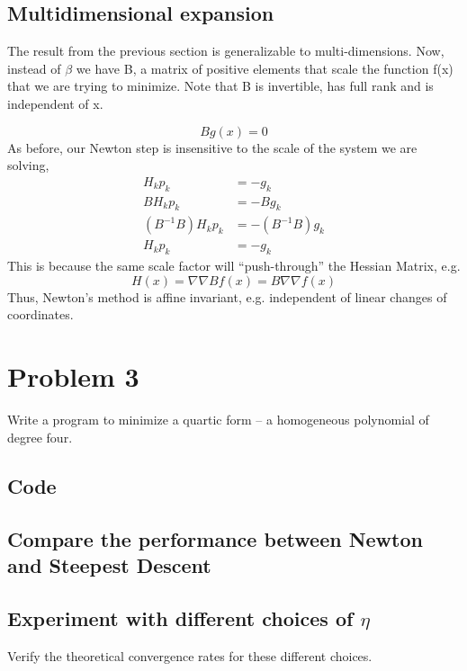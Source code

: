 \documentclass{article}
\begin{document}
\subsection{Multidimensional expansion}

The result from the previous section is generalizable to
multi-dimensions. Now, instead of $\beta$ we have B, a matrix of
positive elements that scale the function f(x) that we are trying to
minimize. Note that B is invertible, has full rank and is independent of
x. 

\begin{equation}
 Bg(x) = 0
\end{equation}
As before, our Newton step is insensitive to the scale of the system we
are solving, 
\begin{align*}
 H_{k} p_{k}&=-g_{k}\\
 B H_{k} p_{k}&=- B g_{k}\\
 (B^{-1}B)H_{k} p_{k}&=-(B^{-1}B)g_{k} \\
 H_{k} p_{k}&=-g_{k}
\end{align*}
This is because the same scale factor will ``push-through'' the Hessian
Matrix, e.g. 
\begin{equation}
H(x) = \nabla\nabla B f(x) = B \nabla\nabla f(x) 
\end{equation}
Thus, Newton's method is affine invariant, e.g. independent of linear
changes of coordinates. 

\section{Problem 3}

Write a program to minimize a quartic form -- a homogeneous polynomial
of degree four. 

\subsection{Code}

\subsection{Compare the performance between Newton and Steepest Descent}

\subsection{Experiment with different choices of $\eta$}

Verify the theoretical convergence rates for these different choices. 
\end{document}
